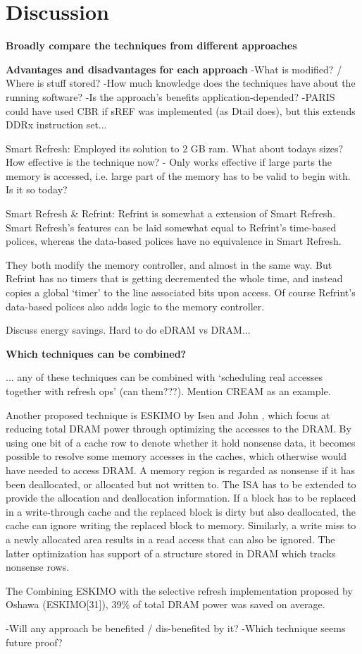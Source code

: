 \section{Discussion} 
\label{sec:disc}

\textbf{Broadly compare the techniques from different approaches}

\textbf{Advantages and disadvantages for each approach}
-What is modified? / Where is stuff stored?
-How much knowledge does the techniques have about the running software?
-Is the approach's benefits application-depended?
-PARIS could have used CBR if sREF was implemented (as Dtail does), but this extends DDRx instruction set...

Smart Refresh:
Employed its solution to 2 GB ram. What about todays sizes? How effective is the technique now? - Only works effective if large parts the memory is accessed, i.e. large part of the memory has to be valid to begin with. Is it so today?

Smart Refresh \& Refrint:
Refrint is somewhat a extension of Smart Refresh. Smart Refresh's features can be laid somewhat equal to Refrint's time-based polices, whereas the data-based polices have no equivalence in Smart Refresh.

They both modify the memory controller, and almost in the same way. But Refrint has no timers that is getting decremented the whole time, and instead copies a global `timer' to the line associated bits upon access. Of course Refrint's data-based polices also adds logic to the memory controller.

Discuss energy savings. Hard to do eDRAM vs DRAM...

\textbf{Which techniques can be combined?}

... any of these techniques can be combined with `scheduling real accesses together with refresh ops' (can them???). Mention CREAM as an example. 

Another proposed technique is ESKIMO by Isen and John \cite{eskimo}, which focus at reducing total DRAM power through optimizing the accesses to the DRAM. By using one bit of a cache row to denote whether it hold nonsense data, it becomes possible to resolve some memory accesses in the caches, which otherwise would have needed to access DRAM. A memory region is regarded as nonsense if it has been deallocated, or allocated but not written to. The ISA has to be extended to provide the allocation and deallocation information. If a block has to be replaced in a write-through cache and the replaced block is dirty but also deallocated, the cache can ignore writing the replaced block to memory. Similarly, a write miss to a newly allocated area results in a read access that can also be ignored. The latter optimization has support of a structure stored in DRAM which tracks nonsense rows. 

The 
Combining ESKIMO with the selective refresh implementation proposed by Oshawa \cite{oshawa} (ESKIMO[31]), $39\%$ of total DRAM power was saved on average.   

-Will any approach be benefited / dis-benefited by it?
-Which technique seems future proof?